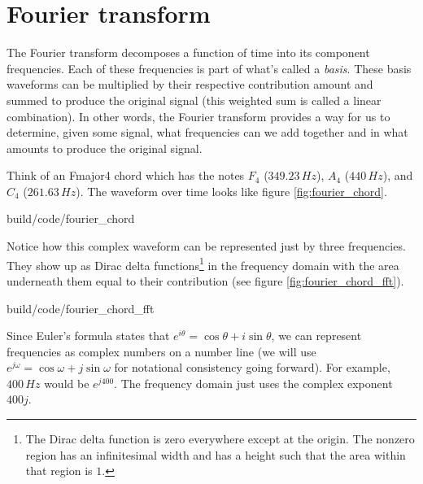 \section{Fourier transform}

The Fourier transform decomposes a function of time into its component
frequencies. Each of these frequencies is part of what's called a
\textit{basis}. These basis waveforms can be multiplied by their respective
contribution amount and summed to produce the original signal (this weighted sum
is called a linear combination). In other words, the Fourier transform provides
a way for us to determine, given some signal, what frequencies can we add
together and in what amounts to produce the original signal.

Think of an Fmajor4 chord which has the notes $F_4$ ($349.23\,Hz$), $A_4$
($440\,Hz$), and $C_4$ ($261.63\,Hz$). The waveform over time looks like figure
\ref{fig:fourier_chord}.

\begin{svg}{build/code/fourier_chord}
  \caption{Frequency decomposition of Fmajor4 chord}
  \label{fig:fourier_chord}
\end{svg}

Notice how this complex waveform can be represented just by three frequencies.
They show up as Dirac delta functions\footnote{The Dirac delta function is zero
everywhere except at the origin. The nonzero region has an infinitesimal width
and has a height such that the area within that region is $1$.} in the frequency
domain with the area underneath them equal to their contribution (see figure
\ref{fig:fourier_chord_fft}).

\begin{svg}{build/code/fourier_chord_fft}
  \caption{Fourier transform of Fmajor4 chord}
  \label{fig:fourier_chord_fft}
\end{svg}

Since Euler's formula states that $e^{i\theta} = \cos\theta + i\sin\theta$, we
can represent frequencies as complex numbers on a number line (we will use
$e^{j\omega} = \cos\omega + j\sin\omega$ for notational consistency going
forward). For example, $400\,Hz$ would be $e^{j400}$. The frequency domain just
uses the complex exponent $400j$.
